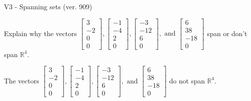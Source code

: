 \begin{exercise}
  \begin{exerciseTitle}V3 - Spanning sets (ver. 909)\end{exerciseTitle}
  \begin{exerciseStatement}
    Explain why the vectors \(\left[\begin{array}{r}
3 \\
-2 \\
0 \\
0
\end{array}\right] , \left[\begin{array}{r}
-1 \\
-4 \\
2 \\
0
\end{array}\right] , \left[\begin{array}{r}
-3 \\
-12 \\
6 \\
0
\end{array}\right] , \text{ and } \left[\begin{array}{r}
6 \\
38 \\
-18 \\
0
\end{array}\right]\) span or don't span \(\mathbb{R}^4\). 
	


  \end{exerciseStatement}
  \begin{exerciseAnswer}
   The vectors \(\left[\begin{array}{r}
3 \\
-2 \\
0 \\
0
\end{array}\right] , \left[\begin{array}{r}
-1 \\
-4 \\
2 \\
0
\end{array}\right] , \left[\begin{array}{r}
-3 \\
-12 \\
6 \\
0
\end{array}\right] , \text{ and } \left[\begin{array}{r}
6 \\
38 \\
-18 \\
0
\end{array}\right]\) 
  	 do not  
	span \(\mathbb{R}^4\).
  


  \end{exerciseAnswer}
\end{exercise}